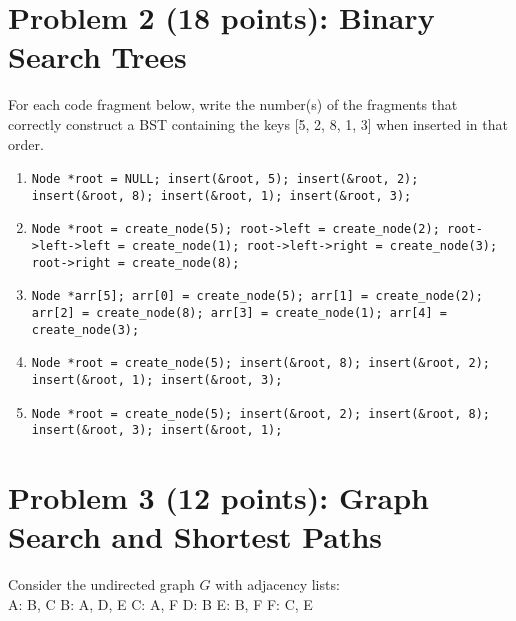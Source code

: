 \documentclass[12pt]{article}
\begin{document}
\newpage

\section*{Problem 2 (18 points): Binary Search Trees}
For each code fragment below, write the number(s) of the fragments that correctly construct a BST containing the keys [5, 2, 8, 1, 3] when inserted in that order.

\begin{enumerate}
\item \verb|Node *root = NULL; insert(&root, 5); insert(&root, 2); insert(&root, 8); insert(&root, 1); insert(&root, 3);|
\item \verb|Node *root = create_node(5); root->left = create_node(2); root->left->left = create_node(1); root->left->right = create_node(3); root->right = create_node(8);|
\item \verb|Node *arr[5]; arr[0] = create_node(5); arr[1] = create_node(2); arr[2] = create_node(8); arr[3] = create_node(1); arr[4] = create_node(3);|  %
\item \verb|Node *root = create_node(5); insert(&root, 8); insert(&root, 2); insert(&root, 1); insert(&root, 3);|
\item \verb|Node *root = create_node(5); insert(&root, 2); insert(&root, 8); insert(&root, 3); insert(&root, 1);|
\end{enumerate}

\newpage

\section*{Problem 3 (12 points): Graph Search and Shortest Paths}
Consider the undirected graph $G$ with adjacency lists: \\
A: B, C \quad B: A, D, E \quad C: A, F \quad D: B \quad E: B, F \quad F: C, E
\end{document}
